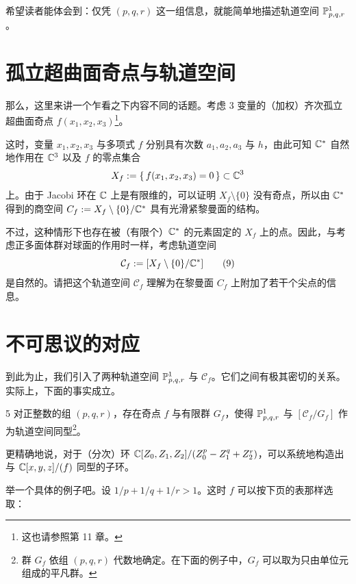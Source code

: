 希望读者能体会到：仅凭 $(p,q,r)$ 这一组信息，就能简单地描述轨道空间 $\mathbb{P}^1_{p,q,r}$。

\section{孤立超曲面奇点与轨道空间}

那么，这里来讲一个乍看之下内容不同的话题。考虑 3 变量的（加权）齐次孤立超曲面奇点 $f(x_1,x_2,x_3)$\footnote{这也请参照第 11 章。}。

这时，变量 $x_1,x_2,x_3$ 与多项式 $f$ 分别具有次数 $a_1,a_2,a_3$ 与 $h$，由此可知 $\mathbb{C}^*$ 自然地作用在 $\mathbb{C}^3$ 以及 $f$ 的零点集合
\[
  X_f := \{\, f(x_1,x_2,x_3)=0 \,\} \subset \mathbb{C}^3
\]
上。由于 Jacobi 环在 $\mathbb{C}$ 上是有限维的，可以证明 $X_f\setminus\{0\}$ 没有奇点，所以由 $\mathbb{C}^*$ 得到的商空间 $C_f:=X_f\setminus\{0\}/\mathbb{C}^*$ 具有光滑紧黎曼面的结构。

不过，这种情形下也存在被（有限个）$\mathbb{C}^*$ 的元素固定的 $X_f$ 上的点。因此，与考虑正多面体群对球面的作用时一样，考虑轨道空间
\begin{equation}
  \mathcal{C}_f := [X_f\setminus\{0\}/\mathbb{C}^*] \tag{9}
\end{equation}
是自然的。请把这个轨道空间 $\mathcal{C}_f$ 理解为在黎曼面 $C_f$ 上附加了若干个尖点的信息。

\section{不可思议的对应}

到此为止，我们引入了两种轨道空间 $\mathbb{P}^1_{p,q,r}$ 与 $\mathcal{C}_f$。它们之间有极其密切的关系。实际上，下面的事实成立。

\begin{theorem}{5}
  对正整数的组 $(p,q,r)$，存在奇点 $f$ 与有限群 $G_f$，使得 $\mathbb{P}^1_{p,q,r}$ 与 $[\mathcal{C}_f/G_f]$ 作为轨道空间同型\footnote{群 $G_f$ 依组 $(p,q,r)$ 代数地确定。在下面的例子中，$G_f$ 可以取为只由单位元组成的平凡群。}。
\end{theorem}

更精确地说，对于（分次）环 $\mathbb{C}[Z_0,Z_1,Z_2]/(Z_0^p-Z_1^q+Z_2^r)$，可以系统地构造出与 $\mathbb{C}[x,y,z]/(f)$ 同型的子环。

举一个具体的例子吧。设 $1/p+1/q+1/r>1$。这时 $f$ 可以按下页的表那样选取：

